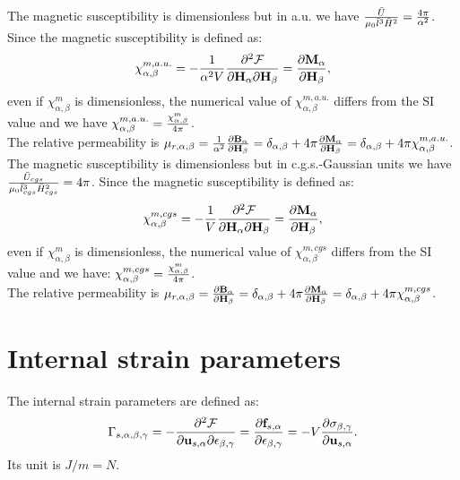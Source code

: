 \documentclass[12pt,a4paper]{article}
\begin{document}
{\color{web-blue} The magnetic susceptibility is dimensionless but
in a.u. we have
${\bar U \over \mu_0 \bar l^3 \bar H^2}={4\pi \over \alpha^2}$.
Since the magnetic susceptibility is defined as:
\begin{equation}
\chi^{m,a.u.}_{\alpha,\beta}=-{1 \over \alpha^2 V} 
{\partial^2 \mathcal{F} \over \partial 
{\bf H}_{\alpha} \partial {\bf H}_{\beta}}
={\partial {\bf M}_{\alpha} \over \partial {\bf H}_{\beta}},
\end{equation}
even if $\chi^m_{\alpha,\beta}$ is dimensionless,
the numerical value of $\chi^{m,a.u.}_{\alpha,\beta}$ differs from the
SI value and we have
$\chi^{m,a.u.}_{\alpha,\beta} = {\chi^m_{\alpha,\beta} \over 4 \pi}$. \\
The relative permeability is $\mu_{r,\alpha,\beta}=
{1\over \alpha^2}{\partial {\bf B}_{\alpha} \over \partial {\bf H}_\beta}=
\delta_{\alpha,\beta} 
+4 \pi {\partial {\bf M}_\alpha \over \partial {\bf H}_\beta} = 
\delta_{\alpha,\beta} + 
4 \pi \chi^{m,a.u.}_{\alpha,\beta}$.
}
\\

{\color{orange} The magnetic susceptibility is dimensionless but
in c.g.s.-Gaussian units we have
${\bar U_{cgs} \over \mu_0 \bar l_{cgs}^3 \bar H_{cgs}^2}=
{4\pi}$. Since the magnetic susceptibility is defined as:
\begin{equation}
\chi^{m,cgs}_{\alpha,\beta}=-{1 \over V} 
{\partial^2 \mathcal{F} \over \partial 
{\bf H}_{\alpha} \partial {\bf H}_{\beta}}=
{\partial {\bf M}_{\alpha} \over \partial {\bf H}_{\beta}},
\end{equation}
even if $\chi^m_{\alpha,\beta}$ is dimensionless,
the numerical value of $\chi^{m,cgs}_{\alpha,\beta}$ differs from the
SI value and we have:
$\chi^{m,cgs}_{\alpha,\beta} = {\chi^m_{\alpha,\beta} \over 4 \pi}$. \\
The relative permeability is $\mu_{r,\alpha,\beta}=
{\partial {\bf B}_{\alpha} \over \partial {\bf H}_\beta}=
\delta_{\alpha,\beta} 
+4 \pi {\partial {\bf M}_\alpha \over \partial {\bf H}_\beta} = 
\delta_{\alpha,\beta} + 
4 \pi \chi^{m,cgs}_{\alpha,\beta}$.
}

\newpage
\section{\color{coral}Internal strain parameters}
The internal strain parameters are defined as:
\begin{equation}
\Gamma_{s,\alpha,\beta,\gamma}=-{\partial^2 \mathcal{F} \over \partial 
{\bf u}_{s,\alpha} \partial \epsilon_{\beta,\gamma}}
={\partial {\bf f}_{s,\alpha} \over \partial \epsilon_{\beta,\gamma}}
=-V {\partial \sigma_{\beta,\gamma}\over \partial {\bf u}_{s,\alpha}}.
\label{isp}
\end{equation}
Its unit is $J/m=N$.
\\
\end{document}
